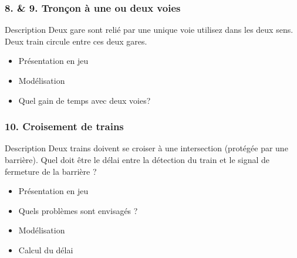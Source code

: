 \documentclass[french]{beamer}
\begin{document}
\begin{frame}
  \frametitle{8. \& 9.  Tronçon à une ou deux voies}
  \begin{block}{Description}
    Deux gare sont relié par une unique voie utilisez dans les deux
    sens. Deux train circule entre ces deux gares.
  \end{block}

  \begin{itemize}
  \item Présentation en jeu
  \item Modélisation
  \item Quel gain de temps avec deux voies?

  \end{itemize}
\end{frame}

\begin{frame}
  \frametitle{10. Croisement de trains}
  \begin{block}{Description}
  Deux trains doivent se croiser à une intersection (protégée par une barrière).
  Quel doit être le délai entre la détection du train et
  le signal de fermeture de la barrière ? 
  \end{block}

  \begin{itemize}
  \item Présentation en jeu
  \item Quels problèmes sont envisagés ?
  \item Modélisation
  \item Calcul du délai
  \end{itemize}
\end{frame}
\end{document}

